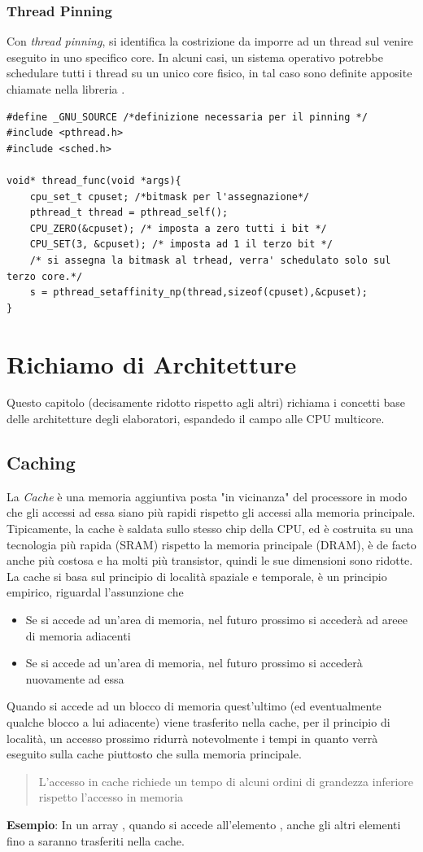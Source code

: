 \documentclass[10pt, letterpaper]{report}
\begin{document}
\subsection{Thread Pinning}
Con \textit{thread pinning}, si identifica la costrizione da imporre ad un thread sul venire eseguito in uno specifico core. In alcuni casi, un sistema operativo potrebbe schedulare tutti i thread su un unico core fisico, in tal caso sono definite apposite chiamate nella libreria .
\begin{lstlisting}[style=CStyle]
#define _GNU_SOURCE /*definizione necessaria per il pinning */
#include <pthread.h> 
#include <sched.h> 

void* thread_func(void *args){
    cpu_set_t cpuset; /*bitmask per l'assegnazione*/
    pthread_t thread = pthread_self(); 
    CPU_ZERO(&cpuset); /* imposta a zero tutti i bit */
    CPU_SET(3, &cpuset); /* imposta ad 1 il terzo bit */
    /* si assegna la bitmask al trhead, verra' schedulato solo sul terzo core.*/
    s = pthread_setaffinity_np(thread,sizeof(cpuset),&cpuset);
}
\end{lstlisting}
\chapter{Richiamo di Architetture}
Questo capitolo (decisamente ridotto rispetto agli altri) richiama i concetti base delle architetture degli elaboratori, espandedo il campo alle CPU multicore.
\section{Caching}
La \textit{Cache} è una memoria aggiuntiva posta "in vicinanza" del processore in modo che gli accessi ad essa siano più rapidi rispetto gli accessi alla memoria principale. Tipicamente, la cache è saldata sullo stesso chip della CPU, ed è costruita su una tecnologia più rapida (SRAM) rispetto la memoria principale (DRAM), è de facto anche più costosa e ha molti più transistor, quindi le sue dimensioni sono ridotte.\acc 
La cache si basa sul principio di località spaziale e temporale, è un principio empirico, riguardal l'assunzione che\begin{itemize}
    \item Se si accede ad un'area di memoria, nel futuro prossimo si accederà ad areee di memoria adiacenti 
    \item Se si accede ad un'area di memoria, nel futuro prossimo si accederà nuovamente ad essa 
\end{itemize}
Quando si accede ad un blocco di memoria quest'ultimo (ed eventualmente qualche blocco a lui adiacente) viene trasferito nella cache, per il principio di località, un accesso prossimo ridurrà notevolmente i tempi in quanto verrà eseguito sulla cache piuttosto che sulla memoria principale.\begin{quotation}
    L'accesso in cache richiede un tempo di alcuni ordini di grandezza inferiore rispetto l'accesso in memoria
\end{quotation}
\textbf{Esempio}: In un array , quando si accede all'elemento , anche gli altri elementi fino a  saranno trasferiti nella cache.
\end{document}
